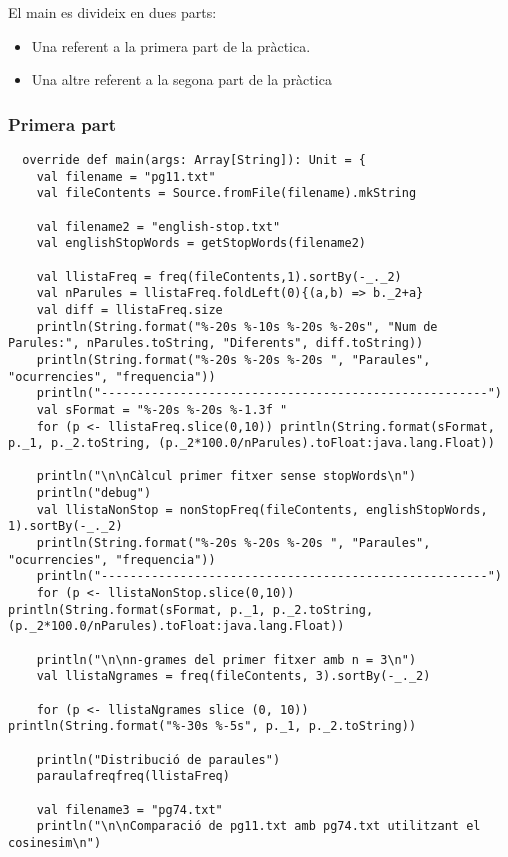 \documentclass[11pt,a4paper,twoside]{report}
\begin{document}
El main es divideix en dues parts:
\begin{itemize}
  \item Una referent a la primera part de la pràctica.
  \item Una altre referent a la segona part de la pràctica
\end{itemize}

\subsubsection{Primera part}

\begin{lstlisting}
  override def main(args: Array[String]): Unit = {
    val filename = "pg11.txt"
    val fileContents = Source.fromFile(filename).mkString

    val filename2 = "english-stop.txt"
    val englishStopWords = getStopWords(filename2)

    val llistaFreq = freq(fileContents,1).sortBy(-_._2)
    val nParules = llistaFreq.foldLeft(0){(a,b) => b._2+a}
    val diff = llistaFreq.size
    println(String.format("%-20s %-10s %-20s %-20s", "Num de Parules:", nParules.toString, "Diferents", diff.toString))
    println(String.format("%-20s %-20s %-20s ", "Paraules", "ocurrencies", "frequencia"))
    println("------------------------------------------------------")
    val sFormat = "%-20s %-20s %-1.3f "
    for (p <- llistaFreq.slice(0,10)) println(String.format(sFormat, p._1, p._2.toString, (p._2*100.0/nParules).toFloat:java.lang.Float))

    println("\n\nCàlcul primer fitxer sense stopWords\n")
    println("debug")
    val llistaNonStop = nonStopFreq(fileContents, englishStopWords, 1).sortBy(-_._2)
    println(String.format("%-20s %-20s %-20s ", "Paraules", "ocurrencies", "frequencia"))
    println("------------------------------------------------------")
    for (p <- llistaNonStop.slice(0,10)) println(String.format(sFormat, p._1, p._2.toString, (p._2*100.0/nParules).toFloat:java.lang.Float))

    println("\n\nn-grames del primer fitxer amb n = 3\n")
    val llistaNgrames = freq(fileContents, 3).sortBy(-_._2)

    for (p <- llistaNgrames slice (0, 10)) println(String.format("%-30s %-5s", p._1, p._2.toString))

    println("Distribució de paraules")
    paraulafreqfreq(llistaFreq)

    val filename3 = "pg74.txt"
    println("\n\nComparació de pg11.txt amb pg74.txt utilitzant el cosinesim\n")


\end{lstlisting}
\end{document}
